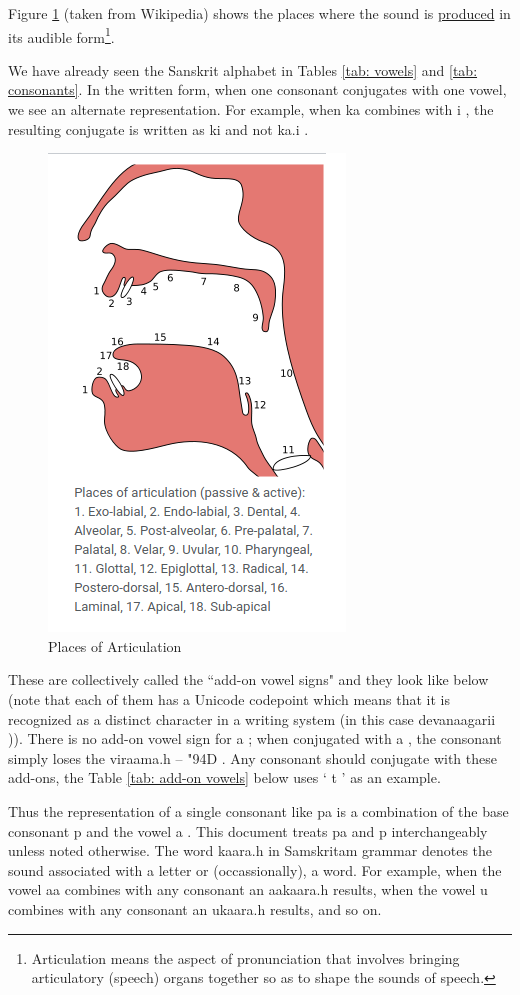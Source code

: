 \documentclass[a4paper, 12pt]{article}
\newcommand \sans[1]{
    \textsanskrit{#1}
}
\begin{document}
Figure \ref{fig: places-of-articulation} (taken from Wikipedia) shows the places where the sound is \href{https://en.wikipedia.org/wiki/Place_of_articulation}{produced} in its audible form\footnote{Articulation means the aspect of pronunciation that involves bringing articulatory (speech) organs together so as to shape the sounds of speech.}.

We have already seen the Sanskrit alphabet in Tables \ref{tab: vowels} and \ref{tab: consonants}. In the written form, when one consonant conjugates with one vowel, we see an alternate representation. For example, when \sans{ka} combines with \sans{i}, the resulting conjugate is written as \sans{ki} and not \sans{ka.i}.
\begin{figure}[htbp!]
    \centering
    \includegraphics[width=0.3\linewidth]{places-of-articulation.png}
    \caption{Places of Articulation}
    \label{fig: places-of-articulation}
\end{figure}

These are collectively called the ``add-on vowel signs" and they look like below (note that each of them has a Unicode codepoint which means that it is recognized as a distinct character in a writing system (in this case \sans{devanaagarii})). There is no add-on vowel sign for \sans{a}; when conjugated with \sans{a}, the consonant simply loses the \sans{viraama.h} -- \sans{\char"94D}. Any consonant should conjugate with these add-ons, the Table \ref{tab: add-on vowels} below uses `\sans{t}' as an example.

Thus the representation of a single consonant like \sans{pa} is a combination of the base consonant \sans{p} and the vowel \sans{a}. This document treats \sans{pa} and \sans{p} interchangeably unless noted otherwise. The word \sans{kaara.h} in Samskritam grammar denotes the sound associated with a letter or (occassionally), a word. For example, when the vowel \sans{aa} combines with any consonant an \sans{aakaara.h} results, when the vowel \sans{u} combines with any consonant an \sans{ukaara.h} results, and so on.
\end{document}

